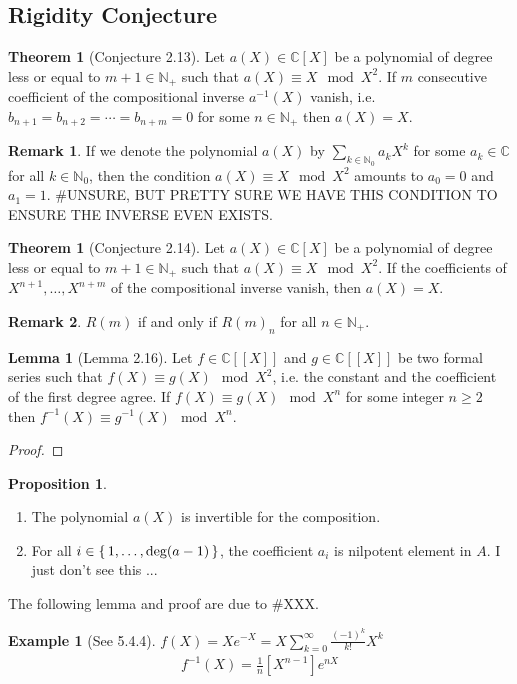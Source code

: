 \documentclass[a4paper]{article}
\theoremstyle{definition}
\newtheorem{example}{Example}[definition]
\newtheorem{theorem}[definition]{Theorem}
\newtheorem{lemma}[definition]{Lemma}
\newtheorem{proposition}[definition]{Proposition}
\newtheorem*{remark}{Remark}
\newcommand{\set}[1]{\mleft\{\, #1 \,\mright\}}
\begin{document}
\subsection{Rigidity Conjecture}
%
\begin{theorem}[Conjecture 2.13]
    Let \(a(X) \in \mathbb{C}[X]\) be a polynomial of degree less or equal to \(m + 1 \in \mathbb{N}_+\) such that \(a(X) \equiv X \mod{X^2}\). If \(m\) consecutive coefficient of the compositional inverse \(a^{-1}(X)\) vanish, i.e. \(b_{n+1} = b_{n+2} = \cdots = b_{n+m} = 0\) for some \(n \in \mathbb{N}_+\) then \(a(X) = X\).
\end{theorem}
%
\begin{remark}
    If we denote the polynomial \(a(X)\) by \(\sum_{k \in \mathbb{N}_0}a_k X^k\) for some \(a_k \in \mathbb{C}\) for all \(k \in \mathbb{N}_0\), then the condition \(a(X) \equiv X \mod{X^2}\) amounts to \(a_0 = 0\) and \(a_1 = 1\). #UNSURE, BUT PRETTY SURE WE HAVE THIS CONDITION TO ENSURE THE INVERSE EVEN EXISTS.
\end{remark}
%
\begin{theorem}[Conjecture 2.14]
    Let \(a(X) \in \mathbb{C}[X]\) be a polynomial of degree less or equal to \(m + 1 \in \mathbb{N}_+\) such that \(a(X) \equiv X \mod{X^2}\). If the coefficients of \(X^{n+1}, \ldots, X^{n+m}\) of the compositional inverse vanish, then \(a(X) = X\).
\end{theorem}
%
\begin{remark}
    \(R(m)\) if and only if \(R(m)_n\) for all \(n \in \mathbb{N}_+\).
\end{remark}
%
\begin{lemma}[Lemma 2.16]
    Let \(f \in \mathbb{C}[[X]]\) and \(g \in \mathbb{C}[[X]]\) be two formal series such that \(f(X) \equiv g(X) \mod{X^2}\), i.e. the constant and the coefficient of the first degree agree. If \(f(X) \equiv g(X) \mod{X^n}\) for some integer \(n \geq 2\) then \(f^{-1}(X) \equiv g^{-1}(X) \mod{X^n}\).
\end{lemma}
\begin{proof}
\end{proof}
%
\begin{proposition}
    \begin{enumerate}
        \item The polynomial \(a(X)\) is invertible for the composition.
        \item For all \(i \in \set{1, \ldots, \text{deg}(a - 1)}\), the coefficient \(a_i\) is nilpotent element in \(A\).
              I just don't see this ...
    \end{enumerate}
\end{proposition}
%
The following lemma and proof are due to \#XXX.
%
\begin{example}[See 5.4.4]
    \(f(X) = X e^{-X} = X \sum_{k=0}^\infty \frac{(-1)^k}{k!} X^k\)
    \begin{align*}
        [X^n]f^{-1}(X) = \frac{1}{n} [X^{n-1}] e^{nX}
    \end{align*}
\end{example}
\end{document}
